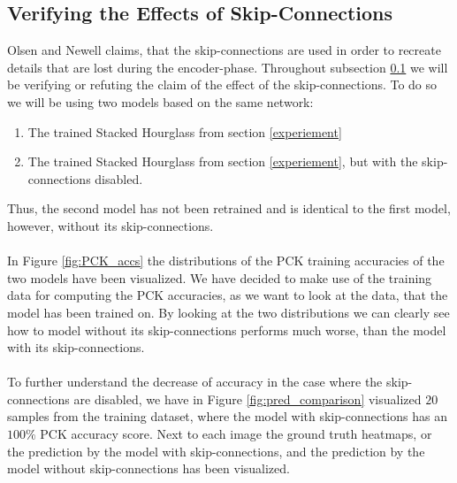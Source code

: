 \documentclass[./main.tex]{subfiles}
\begin{document}
\subsection{Verifying the Effects of Skip-Connections}\label{subsec:verifying_skip_cons}
Olsen \cite{Camilla} and Newell \cite{Newell} claims, that the skip-connections are used in order to recreate details that are lost during the encoder-phase. Throughout subsection \ref{subsec:verifying_skip_cons} we will be verifying or refuting the claim of the effect of the skip-connections. To do so we will be using two models based on the same network:
\begin{enumerate}
    \item The trained Stacked Hourglass from section \ref{experiement}
    \item The trained Stacked Hourglass from section \ref{experiement}, but with the skip-connections disabled.
\end{enumerate}
Thus, the second model has not been retrained and is identical to the first model, however, without its skip-connections.
\\
\\
In Figure \ref{fig:PCK_accs} the distributions of the PCK training accuracies of the two models have been visualized. We have decided to make use of the training data for computing the PCK accuracies, as we want to look at the data, that the model has been trained on. By looking at the two distributions we can clearly see how to model without its skip-connections performs much worse, than the model with its skip-connections.
\\
\\
To further understand the decrease of accuracy in the case where the skip-connections are disabled, we have in Figure \ref{fig:pred_comparison} visualized $20$ samples from the training dataset, where the model with skip-connections has an $100\%$ PCK accuracy score. Next to each image the ground truth heatmaps, or the prediction by the model with skip-connections, and the prediction by the model without skip-connections has been visualized.
\\
\end{document}
